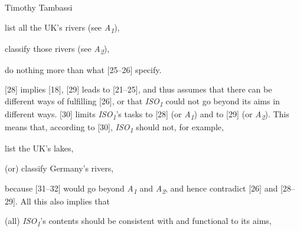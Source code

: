 \begin{artengenv}{Timothy Tambassi}
\setcounter{saveenumtambassi}{\value{enumi}}

\begin{enumerate}[label={[\arabic*]}]

\setcounter{enumi}{\value{saveenumtambassi}}

\item list all the UK's rivers (see \textit{A}\textit{\textsubscript{1}}),

\item classify those rivers (see \textit{A}\textit{\textsubscript{2}}),

\item do nothing more than what [25–26] specify.

\end{enumerate}

[28] implies [18], [29] leads to [21–25], and thus assumes that there can be different ways of fulfilling [26], or that \textit{ISO}\textit{\textsubscript{1}} could not go beyond its aims in different ways. [30] limits \textit{ISO}\textit{\textsubscript{1}}'s tasks to [28] (or \textit{A}\textit{\textsubscript{1}}) and to [29] (or \textit{A}\textit{\textsubscript{2}}). This means that, according to [30], \textit{ISO}\textit{\textsubscript{1}} should not, for example,



\setcounter{saveenumtambassi}{\value{enumi}}

\begin{enumerate}[label={[\arabic*]}]

\setcounter{enumi}{\value{saveenumtambassi}}

\item list the UK's lakes,

\item (or) classify Germany's rivers,

\end{enumerate}

because [31–32] would go beyond \textit{A}\textit{\textsubscript{1}} and \textit{A}\textit{\textsubscript{2}}, and hence contradict [26] and [28–29]. All this also implies that



\setcounter{saveenumtambassi}{\value{enumi}}

\begin{enumerate}[label={[\arabic*]}]

\setcounter{enumi}{\value{saveenumtambassi}}

\item (all) \textit{ISO}\textit{\textsubscript{1}}'s contents should be consistent with and functional to its aims,


\end{enumerate}
\end{artengenv}
